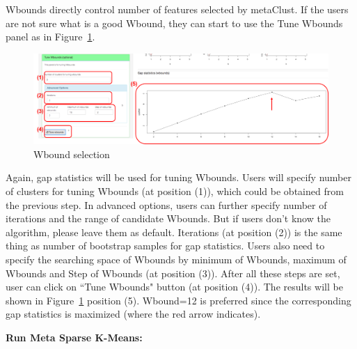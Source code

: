 \begin{steps}
Wbounds directly control number of features selected by metaClust.
If the users are not sure what is a good Wbound,
they can start to use the Tune Wbounds panel as in Figure~\ref{fig:metaClusttuneW}.
\begin{figure}[H]
\begin{center}
\includegraphics[scale=0.5]{./figure/metaClust/tuneW.pdf}
\caption{Wbound selection}
\label{fig:metaClusttuneW}
\end{center}
\end{figure}
Again,
gap statistics will be used for tuning Wbounds.
Users will specify number of clusters for tuning Wbounds (at position {\color{red} (1)}), which could be obtained from the previous step.
In advanced options, users can further specify number of iterations and the range of candidate Wbounds.
But if users don't know the algorithm, please leave them as default.
Iterations (at position {\color{red} (2)}) is the same thing as number of bootstrap samples for gap statistics.
Users also need to specify the searching space of Wbounds by minimum of Wbounds, maximum of Wbounds and Step of Wbounds (at position {\color{red} (3)}).
After all these steps are set,
user can click on ``Tune Wbounds" button (at position {\color{red} (4)}).
The results will be shown in Figure~\ref{fig:metaClusttuneW}  position {\color{red} (5)}.
Wbound=12 is preferred since the corresponding gap statistics is maximized (where the red arrow indicates).

\item \textbf{Run Meta Sparse K-Means:} 


\end{steps}
